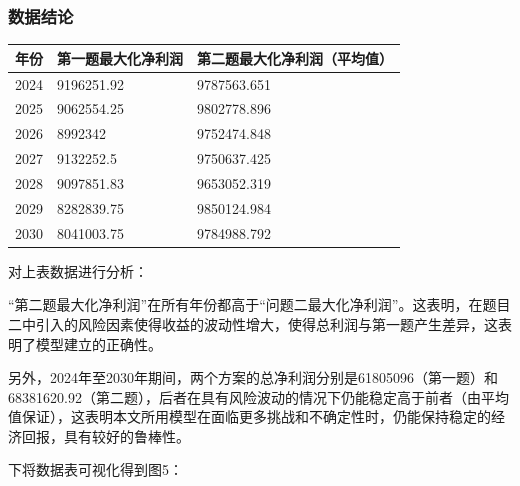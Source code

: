 \documentclass{cumcmthesis}
\begin{document}
\subsubsection{数据结论}
\begin{table}[H]
    \centering
    \begin{tabular}{|l|l|l|}
    \hline
    \textbf{年份} & \textbf{第一题最大化净利润} & \textbf{第二题最大化净利润（平均值）}  \\ \hline
        2024 & 9196251.92 & 9787563.651
        \\ \hline
        2025 & 9062554.25 & 9802778.896
        \\ \hline
        2026 & 8992342 & 9752474.848
        \\ \hline
        2027 & 9132252.5 & 9750637.425
        \\ \hline
        2028 & 9097851.83 & 9653052.319
        \\ \hline
        2029 & 8282839.75 & 9850124.984
        \\ \hline
        2030 & 8041003.75 & 9784988.792
        \\ \hline

    \end{tabular}
\end{table}
对上表数据进行分析：

“第二题最大化净利润”在所有年份都高于“问题二最大化净利润”。这表明，在题目二中引入的风险因素使得收益的波动性增大，使得总利润与第一题产生差异，这表明了模型建立的正确性。

另外，2024年至2030年期间，两个方案的总净利润分别是61805096（第一题）和68381620.92（第二题），后者在具有风险波动的情况下仍能稳定高于前者（由平均值保证），这表明本文所用模型在面临更多挑战和不确定性时，仍能保持稳定的经济回报，具有较好的鲁棒性。

下将数据表可视化得到图5：
\end{document}
